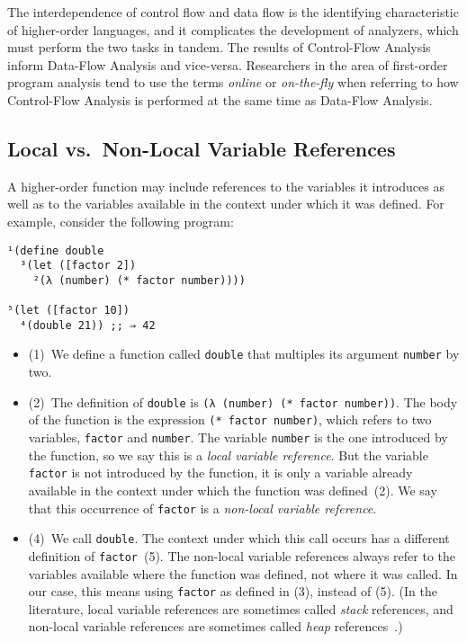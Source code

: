 \documentclass[12pt, oneside]{book}
\begin{document}
The interdependence of control flow and data flow is the identifying characteristic of higher-order languages, and it complicates the development of analyzers, which must perform the two tasks in tandem. The results of Control-Flow Analysis inform Data-Flow Analysis and vice-versa. Researchers in the area of first-order program analysis tend to use the terms \emph{online} or \emph{on-the-fly} when referring to how Control-Flow Analysis is performed at the same time as Data-Flow Analysis.

\subsection{Local vs.\ Non-Local Variable References}

A higher-order function may include references to the variables it introduces as well as to the variables available in the context under which it was defined. For example, consider the following program:

\begin{Verbatim}
¹(define double
  ³(let ([factor 2])
    ²(λ (number) (* factor number))))

⁵(let ([factor 10])
  ⁴(double 21)) ;; ⇒ 42
\end{Verbatim}

\begin{itemize}
  \item (1)~We define a function called \texttt{double} that multiples its argument \texttt{number} by two.
  \item (2)~The definition of \texttt{double} is \texttt{(λ (number) (* factor number))}. The body of the function is the expression \texttt{(* factor number)}, which refers to two variables, \texttt{factor} and \texttt{number}. The variable \texttt{number} is the one introduced by the function, so we say this is a \emph{local variable reference}. But the variable \texttt{factor} is not introduced by the function, it is only a variable already available in the context under which the function was defined~(2). We say that this occurrence of \texttt{factor} is a \emph{non-local variable reference}.
  \item (4)~We call \texttt{double}. The context under which this call occurs has a different definition of \texttt{factor}~(5). The non-local variable references always refer to the variables available where the function was defined, not where it was called. In our case, this means using \texttt{factor} as defined in (3), instead of (5). (In the literature, local variable references are sometimes called \emph{stack} references, and non-local variable references are sometimes called \emph{heap} references~\cite{cfa2}.)
\end{itemize}
\end{document}
